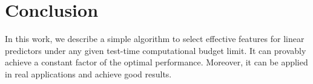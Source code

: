 \section{Conclusion}
In this work, we describe a simple algorithm to select 
effective features for linear predictors under any given 
test-time computational budget limit. It can provably achieve a constant factor 
of the optimal performance. Moreover, it can be applied in real applications and achieve good results.